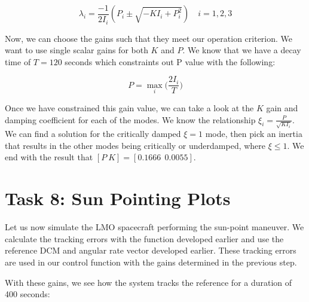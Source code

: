 \documentclass[paper]{aiaaNew}
\begin{document}
\begin{equation}
  \lambda_i = \frac{-1}{2I_i} \left(P_{i} \pm \sqrt{-K I_{i}+P_{i}^{2}}\right) \quad i=1,2,3
\end{equation}

Now, we can choose the gains such that they meet our operation criterion. We want to use single scalar gains for both $K$ and $P$. We know that we have a decay time of $T=120$ seconds which constraints out P value with the following:

\begin{equation}
  P = \max_i \bigg (\frac{2I_i}{T}  \bigg)
\end{equation}

Once we have constrained this gain value, we can take a look at the $K$ gain and damping coefficient for each of the modes. We know the relationship $\xi_i=\frac{P}{\sqrt{KI_i}}$. We can find a solution for the critically damped $\xi = 1$ mode, then pick an inertia that results in the other modes being critically or underdamped, where $\xi \leq 1 $. We end with the result that $[P \  K] = [0.1666  \ \ 0.0055]$.










\section*{Task 8: Sun Pointing Plots}
Let us now simulate the LMO spacecraft performing the sun-point maneuver. We calculate the tracking errors with the function developed earlier and use the reference DCM and angular rate vector developed earlier. These tracking errors are used in our control function with the gains determined in the previous step.

With these gains, we see how the system tracks the reference for a duration of 400 seconds:
\end{document}
